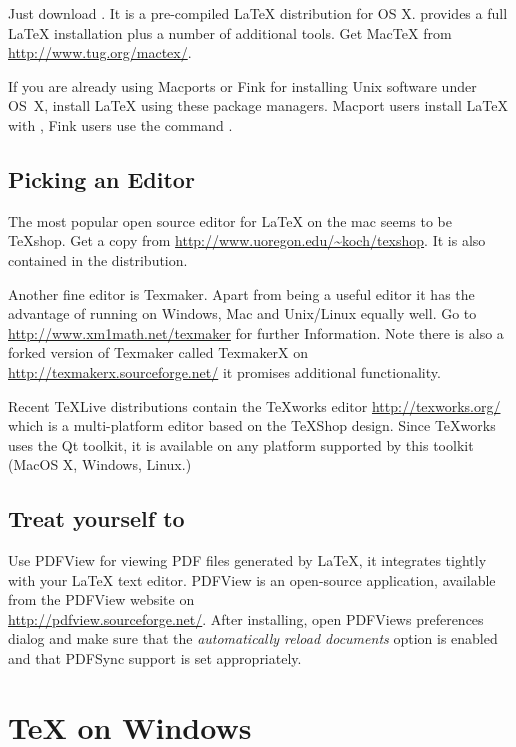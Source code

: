 Just download . It is a
pre-compiled \LaTeX{} distribution for OS X.  provides a full \LaTeX{}
installation plus a number of additional tools. Get Mac\TeX{} from
\url{http://www.tug.org/mactex/}.

If you are already using Macports or Fink for installing Unix software under
OS~X, install \LaTeX{} using these package managers. Macport users install
\LaTeX{} with ,
Fink users use the command .

\subsection{Picking an Editor}

The most popular open source editor for \LaTeX{} on the mac seems to be
\TeX{}shop.  Get a copy from \url{http://www.uoregon.edu/~koch/texshop}. It
is also contained in the  distribution.

Another fine editor is Texmaker. Apart from being a useful editor it has the
advantage of running on Windows, Mac and Unix/Linux equally well. Go to
\url{http://www.xm1math.net/texmaker} for further Information. Note there is
also a forked version of Texmaker called TexmakerX on
\url{http://texmakerx.sourceforge.net/} it promises additional functionality.

Recent \TeX Live distributions contain the \TeX{}works editor 
\url{http://texworks.org/} which is a multi-platform editor based on the \TeX{}Shop
design. Since \TeX{}works uses the Qt toolkit, it is available on any platform
supported by this toolkit (MacOS X, Windows, Linux.) 

\subsection{Treat yourself to }

Use PDFView for viewing PDF files generated by \LaTeX{}, it integrates tightly
with your \LaTeX{} text editor. PDFView is an open-source application, available from the PDFView website on\\
\url{http://pdfview.sourceforge.net/}. After installing, open
PDFViews preferences dialog and make sure that the \emph{automatically reload
documents} option is enabled and that PDFSync support is set appropriately.

\section{\TeX{} on Windows}

